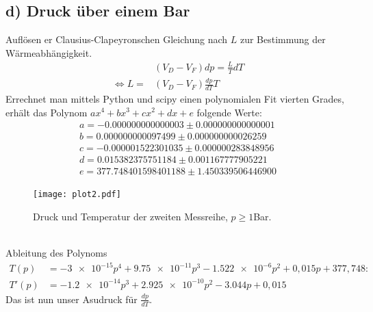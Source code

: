 \newpage
\subsection{d) Druck über einem Bar}
Auflösen er Clausius-Clapeyronschen Gleichung nach $L$ zur Bestimmung der Wärmeabhängigkeit.\\
\begin{align}
  &(V_D-V_F)dp=\frac{L}{T}dT\nonumber\\
  \Leftrightarrow L=&(V_D-V_F)\frac{dp}{dT}T
\end{align}
Errechnet man mittels Python und scipy einen polynomialen Fit vierten Grades, erhält das Polynom $ax^4+bx^3+cx^2+dx+e$ folgende Werte:
\begin{align*}
a = -0.000000000000003 ± 0.000000000000001\\
b = 0.000000000097499 ± 0.000000000026259\\
c = -0.000001522301035 ± 0.000000283848956\\
d = 0.015382375751184 ± 0.001167777905221\\
e = 377.748401598401188 ± 1.450339506446900
\end{align*}
\begin{figure}[h]
    \centering
    \texttt{[image: plot2.pdf]}
    \caption{Druck und Temperatur der zweiten Messreihe, $p\geq 1$Bar.}
\end{figure}
\\
Ableitung des Polynoms
\begin{align}
T(p)&=-\num{3e-15}p^4+\num{9.75e-11}p^3-\num{1.522e-6}p^2+0,015p+377,748:\nonumber\\
T'(p)&=-\num{1.2e-14}p^3+\num{2.925e-10}p^2-\num{3.044}p+0,015
\end{align}
Das ist nun unser Asudruck für $\frac{dp}{dT}$.
